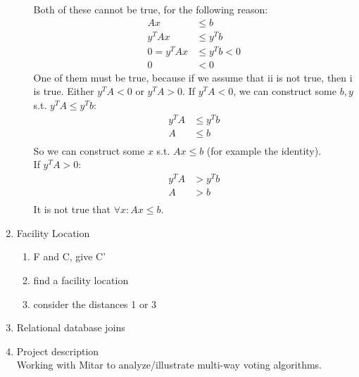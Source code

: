 \documentclass[a4paper]{article}
\begin{document}
\begin{enumerate}
\begin{enumerate}
\begin{enumerate}
			\end{enumerate}
			Both of these cannot be true, for the following reason:
			\begin{align}
				Ax &\leq b \\
				y^TAx &\leq y^Tb \\
				0 = y^TAx &\leq y^Tb <0 \\
				0 &< 0
			\end{align}
			One of them must be true, because if we assume that ii is not true, then i is true.  Either $y^TA < 0$ or $y^TA > 0$.  If $y^TA < 0$, we can construct some $b, y$ s.t. $y^TA \leq y^Tb$:
			\begin{align}
				y^TA &\leq y^Tb \\
				A &\leq b \\
			\end{align}
			So we can construct some $x$ s.t. $Ax \leq b$ (for example the identity). \\
			If $y^TA > 0$:
			\begin{align}
				y^TA &> y^Tb \\
				A &> b \\
			\end{align}
			It is not true that $\forall x : Ax \leq b$.
	\end{enumerate}

\item Facility Location
	\begin{enumerate}
		\item F and C, give C'
		\item find a facility location
		\item consider the distances 1 or 3
	\end{enumerate}
\item Relational database joins

\item Project description \\
	Working with Mitar to analyze/illustrate multi-way voting algorithms.
\end{enumerate}
\end{document}
